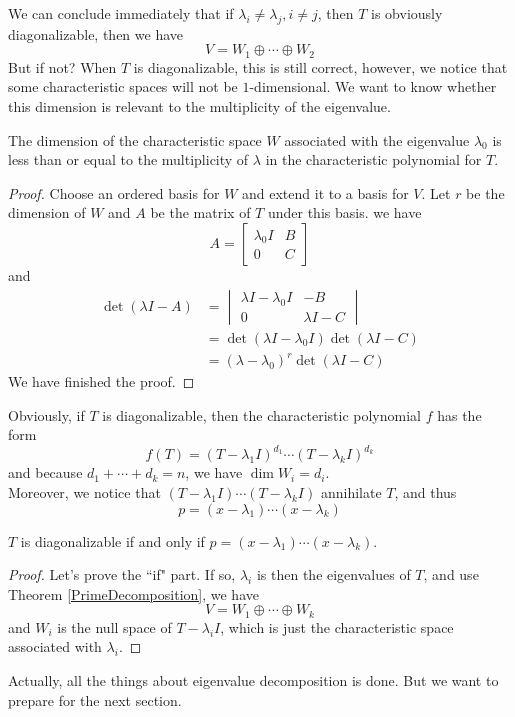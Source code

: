 \documentclass{article}
\begin{document}
We can conclude immediately that if $\lambda_i\neq\lambda_j,i\neq j$, then $T$ is obviously diagonalizable, then we have
\[V=W_1\oplus\cdots\oplus W_2\]
But if not? When $T$ is diagonalizable, this is still correct, however, we notice that some characteristic spaces will not be $1$-dimensional. We want to know whether this dimension is relevant to the multiplicity of the eigenvalue.
\begin{thm}
	The dimension of the characteristic space $W$ associated with the eigenvalue $\lambda_0$ is less than or equal to the multiplicity of $\lambda$ in the characteristic polynomial for $T$.
\end{thm}  
\begin{proof}
	Choose an ordered basis for $W$ and extend it to a basis for $V$. Let $r$ be the dimension of $W$ and $A$ be the matrix of $T$ under this basis. we have
	\[A=\begin{bmatrix}
		\lambda_0 I&B\\
		0&C
	\end{bmatrix}\]
	and
	\begin{align*}
		\det(\lambda I-A)&=\begin{vmatrix}
			\lambda I-\lambda_0I&-B\\
			0&\lambda I-C
		\end{vmatrix}\\
		&=\det(\lambda I-\lambda_0I)\det(\lambda I-C)\\
		&=(\lambda-\lambda_0)^r\det(\lambda I-C)
	\end{align*}
	We have finished the proof.
\end{proof} 
Obviously, if $T$ is diagonalizable, then the characteristic polynomial $f$ has the form
\[f(T)=(T-\lambda_1I)^{d_1}\cdots(T-\lambda_kI)^{d_k}\]
and because $d_1+\cdots+d_k=n$, we have $\dim W_i=d_i$.\\
\indent Moreover, we notice that $(T-\lambda_1I)\cdots(T-\lambda_kI)$ annihilate $T$, and thus
\[p=(x-\lambda_1)\cdots(x-\lambda_k)\] 
\begin{thm}
	$T$ is diagonalizable if and only if $p=(x-\lambda_1)\cdots(x-\lambda_k)$.
\end{thm}
\begin{proof}
	Let's prove the ``if" part. If so, $\lambda_i$ is then the eigenvalues of $T$, and use Theorem \ref{PrimeDecomposition}, we have
	\[V=W_1\oplus\cdots\oplus W_k\]
	and $W_i$ is the null space of $T-\lambda_iI$, which is just the characteristic space associated with $\lambda_i$.
\end{proof}
Actually, all the things about eigenvalue decomposition is done. But we want to prepare for the next section.
\end{document}
